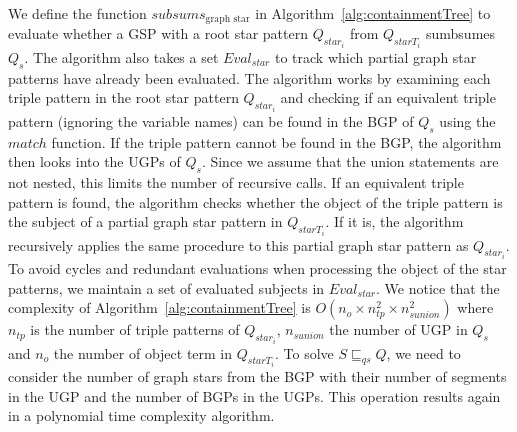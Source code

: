 We define the function $subsums_{\text{graph star}}$ in Algorithm~\ref{alg:containmentTree} to evaluate whether a GSP with a root star pattern $Q_{star_i}$ from $Q_{starT_i}$ sumbsumes $Q_s$. 
The algorithm also takes a set $Eval_{star}$ to track which partial graph star patterns have already been evaluated.
The algorithm works by examining each triple pattern in the root star pattern $Q_{star_i}$ and checking if an equivalent triple pattern (ignoring the variable names) can be found in the BGP of $Q_s$ using the $match$ function.
If the triple pattern cannot be found in the BGP, the algorithm then looks into the UGPs of $Q_s$. 
Since we assume that the union statements are not nested, this limits the number of recursive calls.
If an equivalent triple pattern is found, the algorithm checks whether the object of the triple pattern is the subject of a partial graph star pattern in $Q_{starT_i}$.
If it is, the algorithm recursively applies the same procedure to this partial graph star pattern as $Q_{star_i}$.
To avoid cycles and redundant evaluations when processing the object of the star patterns, we maintain a set of evaluated subjects in $Eval_{star}$.
We notice that the complexity of Algorithm~\ref{alg:containmentTree} is $O( n_o \times n_{tp}^2 \times n_{sunion}^2)$
where $n_{tp}$ is the number of triple patterns of $Q_{star_i}$, $n_{sunion}$ the number of UGP in $Q_s$ and $n_o$ the number of object term in $Q_{starT_i}$.
To solve $S \sqsubseteq_{qs} Q$, we need to consider the number of graph stars from the BGP with their number of segments in the UGP and the number of BGPs in the UGPs.
This operation results again in a polynomial time complexity algorithm.
